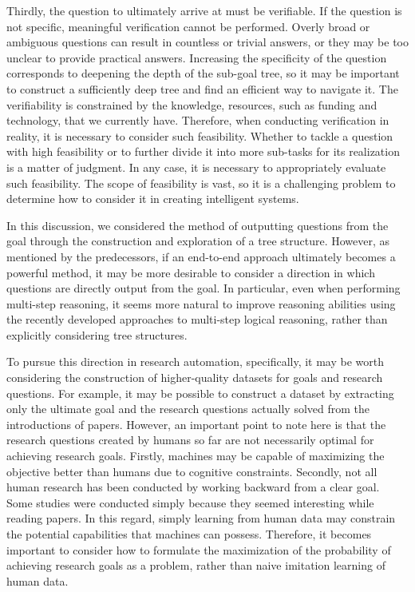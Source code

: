 Thirdly, the question to ultimately arrive at must be verifiable. If the question is not specific, meaningful verification cannot be performed. Overly broad or ambiguous questions can result in countless or trivial answers, or they may be too unclear to provide practical answers. Increasing the specificity of the question corresponds to deepening the depth of the sub-goal tree, so it may be important to construct a sufficiently deep tree and find an efficient way to navigate it. The verifiability is constrained by the knowledge, resources, such as funding and technology, that we currently have. Therefore, when conducting verification in reality, it is necessary to consider such feasibility. Whether to tackle a question with high feasibility or to further divide it into more sub-tasks for its realization is a matter of judgment. In any case, it is necessary to appropriately evaluate such feasibility. The scope of feasibility is vast, so it is a challenging problem to determine how to consider it in creating intelligent systems.

In this discussion, we considered the method of outputting questions from the goal through the construction and exploration of a tree structure. However, as mentioned by the predecessors, if an end-to-end approach ultimately becomes a powerful method, it may be more desirable to consider a direction in which questions are directly output from the goal. In particular, even when performing multi-step reasoning, it seems more natural to improve reasoning abilities using the recently developed approaches to multi-step logical reasoning, rather than explicitly considering tree structures. 

To pursue this direction in research automation, specifically, it may be worth considering the construction of higher-quality datasets for goals and research questions. For example, it may be possible to construct a dataset by extracting only the ultimate goal and the research questions actually solved from the introductions of papers. However, an important point to note here is that the research questions created by humans so far are not necessarily optimal for achieving research goals. Firstly, machines may be capable of maximizing the objective better than humans due to cognitive constraints. Secondly, not all human research has been conducted by working backward from a clear goal. Some studies were conducted simply because they seemed interesting while reading papers. In this regard, simply learning from human data may constrain the potential capabilities that machines can possess. Therefore, it becomes important to consider how to formulate the maximization of the probability of achieving research goals as a problem, rather than naive imitation learning of human data.

